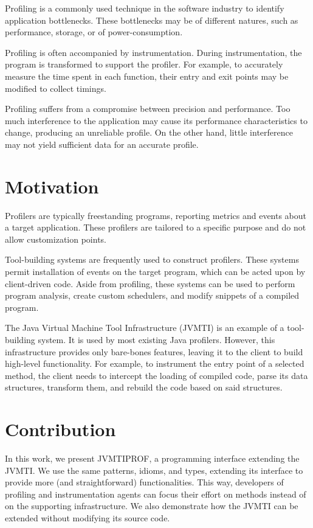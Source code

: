 \label{cap:introduction}

Profiling is a commonly used technique in the software industry to identify application bottlenecks. These bottlenecks may be of different natures, such as performance, storage, or of power-consumption.

Profiling is often accompanied by instrumentation. During instrumentation, the program is transformed to support the profiler. For example, to accurately measure the time spent in each function, their entry and exit points may be modified to collect timings.

Profiling suffers from a compromise between precision and performance. Too much interference to the application may cause its performance characteristics to change, producing an unreliable profile. On the other hand, little interference may not yield sufficient data for an accurate profile.

\section{Motivation}

Profilers are typically freestanding programs, reporting metrics and events about a target application. These profilers are tailored to a specific purpose and do not allow customization points.

Tool-building systems are frequently used to construct profilers. These systems permit installation of events on the target program, which can be acted upon by client-driven code. Aside from profiling, these systems can be used to perform program analysis, create custom schedulers, and modify snippets of a compiled program.

The Java Virtual Machine Tool Infrastructure (JVMTI) is an example of a tool-building system. It is used by most existing Java profilers. However, this infrastructure provides only bare-bones features, leaving it to the client to build high-level functionality. For example, to instrument the entry point of a selected method, the client needs to intercept the loading of compiled code, parse its data structures, transform them, and rebuild the code based on said structures.

\section{Contribution}

In this work, we present JVMTIPROF, a programming interface extending the JVMTI. We use the same patterns, idioms, and types, extending its interface to provide more (and straightforward) functionalities. This way, developers of profiling and instrumentation agents can focus their effort on methods instead of on the supporting infrastructure. We also demonstrate how the JVMTI can be extended without modifying its source code.

